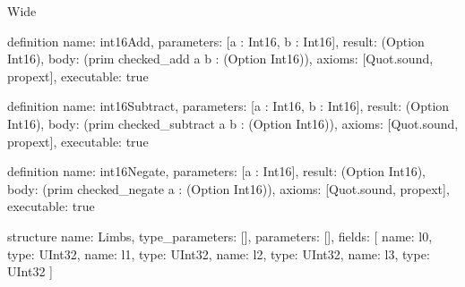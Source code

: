 \begin{lexlean}{Wide}
\begin{semanticmodule}
definition{
  name: int16Add,
  parameters: [a : Int16, b : Int16],
  result: (Option Int16),
  body: (prim checked_add a b : (Option Int16)),
  axioms: [Quot.sound, propext],
  executable: true
}

definition{
  name: int16Subtract,
  parameters: [a : Int16, b : Int16],
  result: (Option Int16),
  body: (prim checked_subtract a b : (Option Int16)),
  axioms: [Quot.sound, propext],
  executable: true
}

definition{
  name: int16Negate,
  parameters: [a : Int16],
  result: (Option Int16),
  body: (prim checked_negate a : (Option Int16)),
  axioms: [Quot.sound, propext],
  executable: true
}

structure{
  name: Limbs,
  type_parameters: [],
  parameters: [],
  fields: [
    {name: l0, type: UInt32},
    {name: l1, type: UInt32},
    {name: l2, type: UInt32},
    {name: l3, type: UInt32}
  ]
}


\end{semanticmodule}
\end{lexlean}

